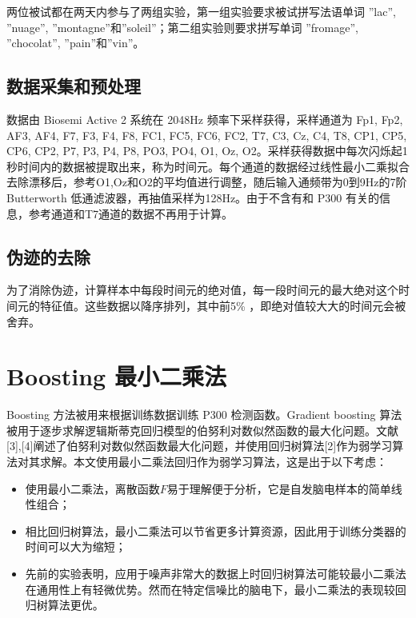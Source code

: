 \documentclass[a4paper]{ecust_thesis_translation}
\renewcommand\![1]{\immature{#1}}
\begin{document}
两位被试都在两天内参与了两组实验，第一组实验要求被试拼写法语单词 ''lac'', ''nuage'', ''montagne''和''soleil''；第二组实验则要求拼写单词 ''fromage'', ''chocolat'', ''pain''和''vin''。

\subsection{数据采集和预处理}
数据由 Biosemi Active 2 系统在 2048Hz 频率下采样获得，采样通道为 Fp1, Fp2, AF3, AF4, F7, F3, F4, F8, FC1, FC5, FC6, FC2, T7, C3, Cz, C4, T8, CP1, CP5, CP6, CP2, P7, P3, P4, P8, PO3, PO4, O1, Oz, O2。采样获得数据中每次闪烁起1秒时间内的数据被提取出来，称为时间元。每个通道的数据经过线性最小二乘拟合去除漂移后，参考O1,Oz和O2的平均值进行调整，随后输入通频带为0到9Hz的7阶 Butterworth 低通滤波器，再抽值采样为128Hz。由于不含有和 P300 有关的信息，参考通道和T7通道的数据不再用于计算。

\subsection{伪迹的去除}
为了消除伪迹，计算样本中每段时间元的绝对值，每一段时间元的最大绝对这个时间元的特征值。这些数据以降序排列，其中前5\% ，即绝对值较大大的时间元会被舍弃。

\section{Boosting 最小二乘法}
Boosting 方法被用来根据训练数据训练 P300 检测函数。Gradient boosting 算法被用于逐步求解逻辑斯蒂克回归模型的伯努利对数似然函数的最大化问题。文献[3],[4]阐述了伯努利对数似然函数最大化问题，并使用回归树算法[2]作为弱学习算法对其求解。本文使用最小二乘法回归作为弱学习算法，这是出于以下考虑：
\begin{itemize}
  \item 使用最小二乘法，离散函数$F$易于理解便于分析，它是自发脑电样本的简单线性组合；
  \item 相比回归树算法，最小二乘法可以节省更多计算资源，因此用于训练分类器的时间可以大为缩短；
  \item 先前的实验表明，应用于噪声非常大的数据上时回归树算法可能较最小二乘法在通用性上有轻微优势。然而在特定信噪比的脑电下，最小二乘法的表现较回归树算法更优。
\end{itemize}
\end{document}
